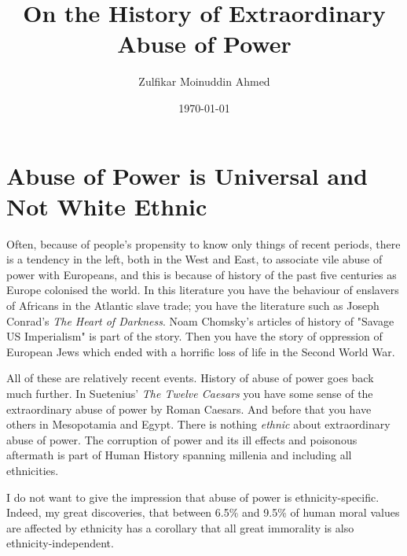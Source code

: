 \documentclass{amsart}
\title{On the History of Extraordinary Abuse of Power}
\author{Zulfikar Moinuddin Ahmed}
\date{\today}
\begin{document}
\maketitle

\section{Abuse of Power is Universal and Not White Ethnic}

Often, because of people's propensity to know only things of recent periods, there is a tendency in the left, both in the West and East, to associate vile abuse of power with Europeans, and this is because of history of the past five centuries as Europe colonised the world.  In this literature you have the behaviour of enslavers of Africans in the Atlantic slave trade; you have the literature such as Joseph Conrad's {\em The Heart of Darkness}.  Noam Chomsky's articles of history of "Savage US Imperialism" is part of the story.  Then you have the story of oppression of European Jews which ended with a horrific loss of life in the Second World War.  

All of these are relatively recent events.  History of abuse of power goes back much further.  In Suetenius' {\em The Twelve Caesars} you have some sense of the extraordinary abuse of power by Roman Caesars.  And before that you have others in Mesopotamia and Egypt.  There is nothing {\em ethnic} about extraordinary abuse of power.  The corruption of power and its ill effects and poisonous aftermath is part of Human History spanning millenia and including all ethnicities.

I do not want to give the impression that abuse of power is ethnicity-specific.  Indeed, my great discoveries, that between 6.5\% and 9.5\% of human moral values are affected by ethnicity has a corollary that all great immorality is also ethnicity-independent.
\end{document}
